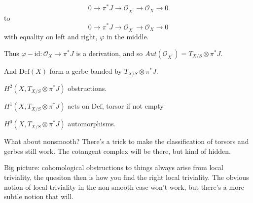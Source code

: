 \documentclass{amsart}
\theoremstyle{definition}
\newcommand{\Def}{\text{Def}}
\newcommand{\OO}{\mathcal{O}}
\newcommand{\Aut}{Aut}
\begin{document}
$$0\to \pi^*J\to \OO_{X^\prime}\to\OO_X\to 0$$
to
$$0\to \pi^*J\to \OO_{X^\prime}\to\OO_X\to 0$$
with equality on left and right, $\varphi$ in the middle.

Thus $\varphi-\text{id}:\OO_X\to \pi^*J$ is a derivation, and so $\Aut(\OO_{X^\prime})=T_{X/S}\otimes\pi^*J$.

And $\Def(X)$ form a gerbe banded by $T_{X/S}\otimes\pi^*J$.

$H^2(X, T_{X/S}\otimes\pi^*J)$ obstructions.

$H^1(X, T_{X/S}\otimes\pi^*J)$ acts on $\Def$, torsor if not empty

$H^0(X, T_{X/S}\otimes\pi^*J)$ automorphisms.

What about nonsmooth?  There's a trick to make the classification of torsors and gerbes still work.  The cotangent complex will be there, but kind of hidden.

Big picture: cohomological obstructions to things always arise from local triviality, the quesiton then is how you find the right local triviality.  The obvious notion of local triviality in the non-smooth case won't work, but there's a more subtle notion that will.

  
\end{document}
